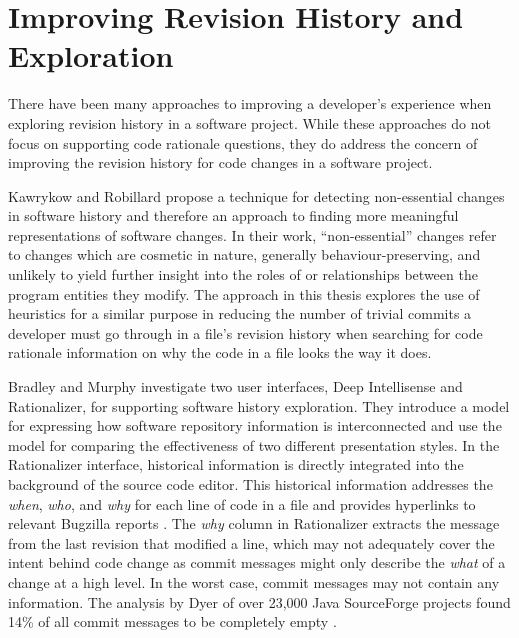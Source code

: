 \section{Improving Revision History and Exploration}

There have been many approaches to improving a developer's experience when exploring revision history in a software project. While these approaches do not focus on supporting code rationale questions, they do address the concern of improving the revision history for code changes in a software project.

Kawrykow and Robillard \cite{kawrykow_non-essential_2011} propose a technique for detecting non-essential changes in software history and therefore an approach to finding more meaningful representations of software changes.
In their work, ``non-essential'' changes refer to changes which are cosmetic in nature, generally behaviour-preserving, and unlikely to yield further insight into the roles of or relationships between the program entities they modify. 
The approach in this thesis explores the use of heuristics for a similar purpose in reducing the number of trivial commits a developer must go through in a file's revision history when searching for code rationale information on why the code in a file looks the way it does.

Bradley and Murphy \cite{bradley_supporting_2011} investigate two user interfaces, Deep Intellisense and Rationalizer, for supporting software history exploration.
They introduce a model for expressing how software repository information is interconnected and use the model for comparing the effectiveness of two different presentation styles.
In the Rationalizer interface, historical information is directly integrated into the background of the source code editor.
This historical information addresses the \emph{when}, \emph{who}, and \emph{why} for each line of code in a file and provides hyperlinks to relevant Bugzilla reports \cite{bradley_supporting_2011}.
The \emph{why} column in Rationalizer extracts the message from the last revision that modified a line, which may not adequately cover the intent behind code change as commit messages might only describe the \emph{what} of a change at a high level.
In the worst case, commit messages may not contain any information.
The analysis by Dyer \etal of over 23,000 Java SourceForge projects found 14\% of all commit messages to be completely empty \cite{dyer_boa_2013}.

